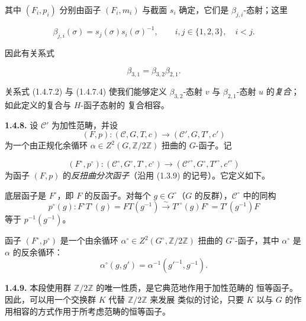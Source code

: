 \clearpage
{}%
其中 $(F_i,p_i)$ 分别由函子 $(F_i,m_i)$ 与截面 $s_i$ 确定，它们是
$\beta_{j,i}$-态射；这里

\begin{equation}
  \beta_{j,i}(\sigma)=s_j(\sigma)s_i(\sigma)^{-1},
  \qquad i,j\in\{1,2,3\},\quad i<j.
  \tag{1.4.7.3}
\end{equation}

因此有关系式

\begin{equation}
  \beta_{3,1}=\beta_{3,2}\beta_{2,1}.
  \tag{1.4.7.4}
\end{equation}

关系式 (1.4.7.2) 与 (1.4.7.4) 使我们能够定义 $\beta_{3,2}$-态射 $v$
与 $\beta_{2,1}$-态射 $u$ 的\emph{复合}；如此定义的复合与 $H$-函子态射的
复合相容。

\noindent\textbf{1.4.8.}\quad
设 $\mathcal C'$ 为加性范畴，并设
\[
  (F,p)\colon(\mathcal C,G,T,c)\longrightarrow
  (\mathcal C',G,T',c')
\]
为一个由正规化余循环
$\alpha\in Z^2(G,\mathbb Z/2\mathbb Z)$ 扭曲的 $G$-函子。记

\begin{equation}
  (F^{\circ},p^{\circ})\colon
  (\mathcal C^{\circ},G^{\circ},T^{\circ},c^{\circ})
  \longrightarrow
  (\mathcal C'^{\circ},G^{\circ},T'^{\circ},c'^{\circ})
  \tag{1.4.8.1}
\end{equation}
为函子 $(F,p)$ 的\emph{反扭曲分次函子}（沿用 (1.3.9) 的记号）。它定义如下。

底层函子是 $F^{\circ}$，即 $F$ 的反函子。对每个
$g\in G^{\circ}$（$G$ 的反群），$\mathcal C^{\circ}$ 中的同构
\[
  p^{\circ}(g)\colon
  F^{\circ}T^{\circ}(g)=FT(g^{-1})
  \overset{\sim}{\longrightarrow}
  T'^{\circ}(g)F^{\circ}=T'(g^{-1})F
\]
等于 $p^{-1}(g^{-1})$。

函子 $(F^{\circ},p^{\circ})$ 是一个由余循环
$\alpha^{\circ}\in Z^2(G^{\circ},\mathbb Z/2\mathbb Z)$ 扭曲的
$G^{\circ}$-函子，其中 $\alpha^{\circ}$ 是 $\alpha$ 的反余循环：
\[
  \alpha^{\circ}(g,g')=\alpha^{-1}(g'^{-1},g^{-1}).
\]

\noindent\textbf{1.4.9.}\quad
本段使用群 $\mathbb Z/2\mathbb Z$ 的唯一性质，是它典范地作用于加性范畴的
恒等函子。因此，可以用一个交换群 $K$ 代替 $\mathbb Z/2\mathbb Z$ 来发展
类似的讨论，只要 $K$ 以与 $G$ 的作用相容的方式作用于所考虑范畴的恒等函子。
